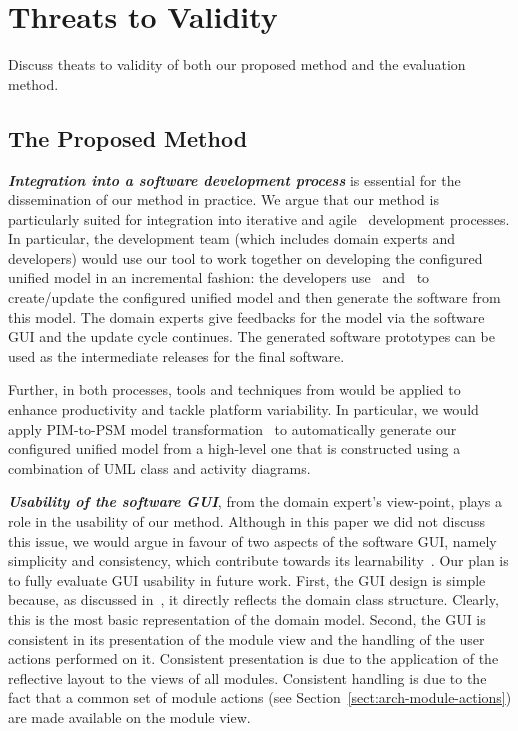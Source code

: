\section{Threats to Validity} \label{sect:threats}
Discuss theats to validity of both our proposed method and the evaluation method.

\subsection{The Proposed Method}

\textbf{\textit{Integration into a software development process}} is essential for the dissemination of our method in practice. We argue that our method is particularly suited for integration into iterative \cite{larman_applying_2004} and agile~\cite{beck_manifesto_2017} development processes. In particular, the development team (which includes domain experts and developers) would use our tool to work together on developing the configured unified model in an incremental fashion: the developers use \dcsl~and \agl~to create/update the configured unified model and then generate the software from this model. The domain experts give feedbacks for the model via the software GUI and the update cycle continues. The generated software prototypes can be used as the intermediate releases for the final software.

Further, in both processes, tools and techniques from  would be applied to enhance productivity and tackle platform variability. In particular, we would apply PIM-to-PSM model transformation~\cite{kent_model_2002,brambilla_model-driven_2012} to automatically generate our configured unified model from a high-level one that is constructed using a combination of UML class and activity diagrams.

\textbf{\textit{Usability of the software GUI}}, from the domain expert's view-point, plays a role in the usability of our method. Although in this paper we did not discuss this issue, we would argue in favour of two aspects of the software GUI, namely simplicity and consistency, which contribute towards its learnability~\cite{folmer_architecting_2004}. Our plan is to fully evaluate GUI usability in future work. First, the GUI design is simple because, as discussed in~\cite{le_domain_2018}, it directly reflects the domain class structure. Clearly, this is the most basic representation of the domain model. Second, the GUI is consistent in its presentation of the module view and the handling of the user actions performed on it. Consistent presentation is due to the application of the reflective layout to the views of all modules. Consistent handling is due to the fact that a common set of module actions (see Section~\ref{sect:arch-module-actions}) are made available on the module view.

